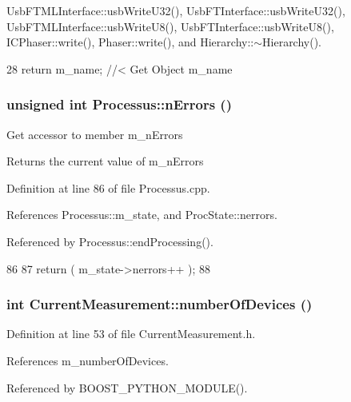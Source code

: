UsbFTMLInterface::usbWriteU32(), UsbFTInterface::usbWriteU32(), UsbFTMLInterface::usbWriteU8(), UsbFTInterface::usbWriteU8(), ICPhaser::write(), Phaser::write(), and Hierarchy::$\sim$Hierarchy().


\begin{DoxyCode}
28 { return m_name; } //< Get Object m_name
\end{DoxyCode}
\hypertarget{classProcessus_a82a0487f82f07cc2c2dc2731f98149e7}{
\subsubsection[{nErrors}]{\setlength{\rightskip}{0pt plus 5cm}unsigned int Processus::nErrors ()}}
\label{classProcessus_a82a0487f82f07cc2c2dc2731f98149e7}
Get accessor to member m\_\-nErrors \begin{DoxyReturn}{Returns}
the current value of m\_\-nErrors 
\end{DoxyReturn}


Definition at line 86 of file Processus.cpp.

References Processus::m\_\-state, and ProcState::nerrors.

Referenced by Processus::endProcessing().


\begin{DoxyCode}
86                                 {
87   return ( m_state->nerrors++ );
88 }
\end{DoxyCode}
\hypertarget{classCurrentMeasurement_a646a9953d7aef3bad2e2dacaab31c241}{
\subsubsection[{numberOfDevices}]{\setlength{\rightskip}{0pt plus 5cm}int CurrentMeasurement::numberOfDevices ()}}
\label{classCurrentMeasurement_a646a9953d7aef3bad2e2dacaab31c241}


Definition at line 53 of file CurrentMeasurement.h.

References m\_\-numberOfDevices.

Referenced by BOOST\_\-PYTHON\_\-MODULE().


